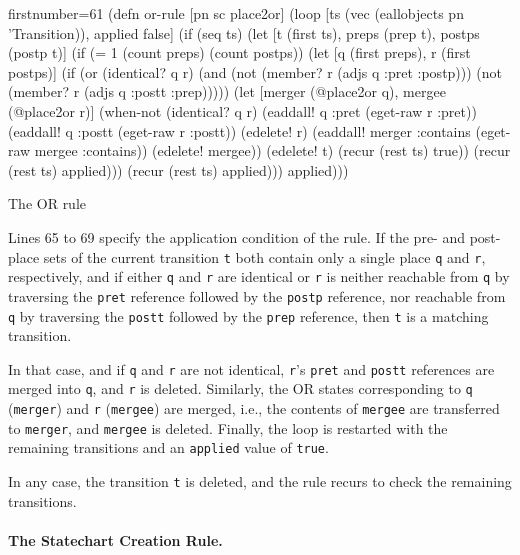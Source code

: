 \documentclass[submission]{eptcs}
\begin{document}
\begin{listing}[H]
  \begin{clojurecode*}{firstnumber=61}
(defn or-rule [pn sc place2or]
  (loop [ts (vec (eallobjects pn 'Transition)), applied false]
    (if (seq ts)
      (let [t (first ts), preps (prep t), postps (postp t)]
        (if (= 1 (count preps) (count postps))
          (let [q (first preps), r (first postps)]
            (if (or (identical? q r)
                    (and (not (member? r (adjs q :pret :postp)))
                         (not (member? r (adjs q :postt :prep)))))
              (let [merger (@place2or q), mergee (@place2or r)]
                (when-not (identical? q r)
                  (eaddall! q :pret  (eget-raw r :pret))
                  (eaddall! q :postt (eget-raw r :postt))
                  (edelete! r)
                  (eaddall! merger :contains (eget-raw mergee :contains))
                  (edelete! mergee))
                (edelete! t)
                (recur (rest ts) true))
              (recur (rest ts) applied)))
          (recur (rest ts) applied)))
      applied)))
  \end{clojurecode*}
  \label{lst:or-rule}
  \caption{The OR rule}
\end{listing}

Lines 65 to 69 specify the application condition of the rule.  If the pre- and
post-place sets of the current transition \verb|t| both contain only a single
place \verb|q| and \verb|r|, respectively, and if either \verb|q| and \verb|r|
are identical or \verb|r| is neither reachable from \verb|q| by traversing the
\verb|pret| reference followed by the \verb|postp| reference, nor reachable
from \verb|q| by traversing the \verb|postt| followed by the \verb|prep|
reference, then \verb|t| is a matching transition.

In that case, and if \verb|q| and \verb|r| are not identical, \verb|r|'s
\verb|pret| and \verb|postt| references are merged into \verb|q|, and \verb|r|
is deleted.  Similarly, the OR states corresponding to \verb|q| (\verb|merger|)
and \verb|r| (\verb|mergee|) are merged, i.e., the contents of \verb|mergee|
are transferred to \verb|merger|, and \verb|mergee| is deleted.  Finally, the
loop is restarted with the remaining transitions and an \verb|applied| value of
\verb|true|.

In any case, the transition \verb|t| is deleted, and the rule recurs to check
the remaining transitions.

\paragraph{The Statechart Creation Rule.}
\label{sec:statechart-rule}
\end{document}
